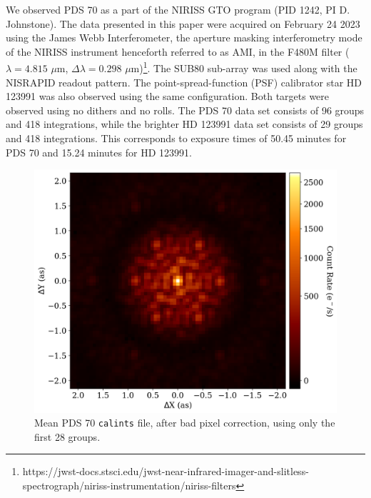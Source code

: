\documentclass[11pt,twocolumn,twocolappendix]{aastex631}
\begin{document}
We observed PDS 70 as a part of the NIRISS GTO program (PID 1242, PI D. Johnstone). The data presented in this paper were acquired on February 24 2023 using the James Webb Interferometer, 
{the aperture masking interferometry mode of the NIRISS instrument \citep{2012SPIE.8442E..2SS,2023PASP..135a5003S,2023PASP..135i8001D} henceforth referred to as AMI, in the F480M filter ($\lambda=4.815$ $\mu$m, $\Delta\lambda=0.298$ $\mu$m)}\footnote{https://jwst-docs.stsci.edu/jwst-near-infrared-imager-and-slitless-spectrograph/niriss-instrumentation/niriss-filters}.
The SUB80 sub-array was used along with the NISRAPID readout pattern. The point-spread-function (PSF) calibrator star HD 123991 was also observed using the same configuration. Both targets were observed using no dithers and no rolls. The PDS 70 data set consists of 96 groups and 418 integrations, while the brighter HD 123991 data set consists of 29 groups and 418 integrations. This corresponds to exposure times of 50.45 minutes for PDS 70 and 15.24 minutes for HD 123991.

\begin{figure}
\centering
\includegraphics[width=1\linewidth]{f480M_pds70_Data_used_e4.png}
\caption{Mean PDS 70 \texttt{calints} file, after bad pixel correction, using only the first 28 groups. }
\label{fig:f480M_data}
\end{figure}
\end{document}
